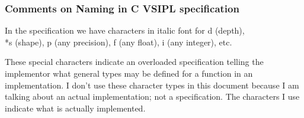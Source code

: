 \subsubsection*{Comments on Naming in C VSIPL specification}
In the \cvl specification we have characters in italic font for d (depth), \\*s (shape), p (any precision), f (any float), i (any integer), etc. 

These special characters indicate an overloaded specification telling the implementor what general types may be defined for a function in an implementation.   I don't use these character types in this document because I am talking about an actual implementation; not a specification.  The characters I use indicate what is actually implemented.